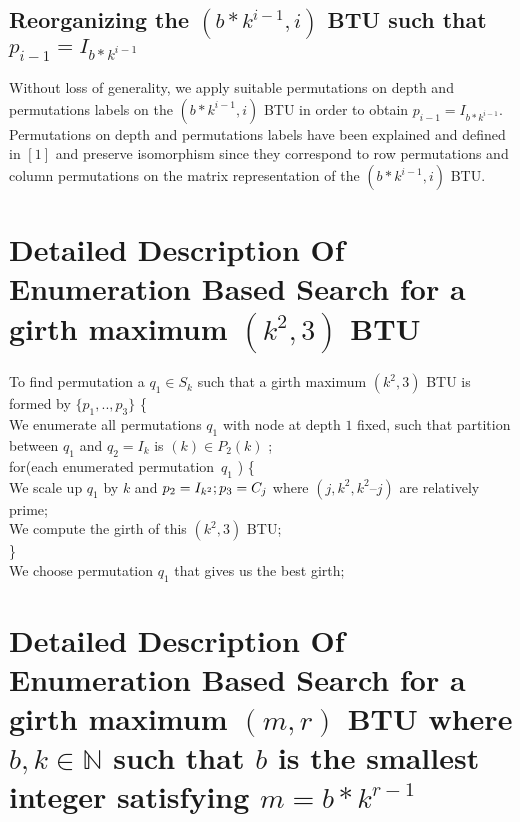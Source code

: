 \documentclass{llncs}
\begin{document}
\subsection {Reorganizing the $(b \ast k^{i -1}, i)$ BTU such that $p_{i -1} = I_{b \ast k^{i -1}}$ }
Without loss of generality,  we apply suitable permutations on depth and permutations labels on the $(b \ast k^{i -1}, i)$ BTU in order to obtain $p_{i -1} = I_{b \ast k^{i -1}}$.  Permutations on depth and permutations labels have been explained and defined in $[1]$ and preserve isomorphism since they correspond to row permutations and column permutations on the matrix representation of the $(b \ast k^{i -1}, i)$ BTU.

\section {Detailed Description Of Enumeration Based Search for a girth maximum  $(k^2, 3)$ BTU}

To find permutation a $q_{1} \in S_{k} $ such that a girth maximum  $(k^{2},3)$ BTU is formed by  $\{p_{1},..,p_{3}\}$ \{  \\
We enumerate all permutations  $q_{1}$ with node at depth $1$ fixed,
such that partition between  $q_{1}$  and  $q_{2} = I_{k} $ is $(k) \in P_2(k)$ ; \\
for(each enumerated permutation\  $q_{1}$ ) \{ \\
We scale up $q_{1}$ by  $k$ and  $p_{2}=I_{k^{2}}; \\
p_{3}=C_{j}$ where  $(j,k^{2}, k^{2}\text{--}j)$ are relatively prime; \\
We compute the girth of this $(k^2, 3)$ BTU; \\
\} \\
We choose permutation $q_{1}$ that gives us the best girth;

\section {Detailed Description Of Enumeration Based Search for a girth maximum  $(m, r)$ BTU where $b,k\in \mathbb{N}$ such that $b$ is the smallest integer satisfying $m=b\ast k^{r - 1}$ }
\end{document}

